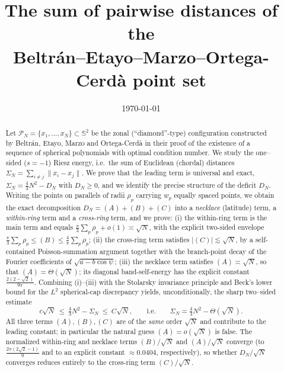 \documentclass[11pt,reqno]{amsart}
\theoremstyle{definition}
\newcommand{\Sph}{\mathbb{S}^2}
\newcommand{\PN}{\mathcal{P}_N}
\newcommand{\dist}[2]{\lVert #1-#2\rVert}
\newcommand{\abs}[1]{\lvert #1\rvert}
\newcommand{\Def}{D_N}
\newcommand{\Sig}{\Sigma_N}
\newcommand{\rp}{\rho}
\begin{document}
\title[Sum of distances for the BEMOC point set]
{The sum of pairwise distances of the\\ Beltr\'an--Etayo--Marzo--Ortega-Cerd\`a point set}

\author{}
\date{\today}

\begin{abstract}
Let $\PN=\{x_1,\dots,x_N\}\subset\Sph$ be the zonal (``diamond''-type) configuration constructed
by Beltr\'an, Etayo, Marzo and Ortega-Cerd\`a in their proof of the existence of a sequence of
spherical polynomials with optimal condition number. We study the one--sided ($s=-1$) Riesz energy,
i.e.\ the sum of Euclidean (chordal) distances
$\Sig=\sum_{i\ne j}\dist{x_i}{x_j}$.
We prove that the leading term is universal and exact,
$\Sig=\tfrac43N^2-\Def$ with $\Def\ge 0$, and we identify the precise structure of the deficit
$\Def$. Writing the points on parallels of radii $\rp_p$ carrying $w_p$ equally spaced points,
we obtain the exact decomposition $\Def=(A)+(B)+(C)$ into a \emph{necklace} (latitude) term,
a \emph{within-ring} term and a \emph{cross-ring} term, and we prove:
(i) the within-ring term is the main term and equals $\frac{\pi}{3}\sum_p\rp_p+o(1)\asymp\sqrt N$,
with the explicit two-sided envelope $\frac{\pi}{3}\sum_p\rp_p\le (B)\le\frac{4}{\pi}\sum_p\rp_p$;
(ii) the cross-ring term satisfies $\abs{(C)}\lesssim\sqrt N$, by a self-contained Poisson-summation
argument together with the branch-point decay of the Fourier coefficients of $\sqrt{a-b\cos\psi}$;
(iii) the necklace term satisfies $(A)\asymp\sqrt N$, so that $(A)=\Theta(\sqrt N)$; its diagonal
band-self-energy has the explicit constant $\frac{2(2-\sqrt2)}{9\pi}$.
Combining (i)--(iii) with the Stolarsky invariance principle and Beck's lower bound for the
$L^2$ spherical-cap discrepancy yields, unconditionally, the sharp two--sided estimate
\[
   c\sqrt N\ \le\ \tfrac43N^2-\Sig\ \le\ C\sqrt N ,
   \qquad\text{i.e.}\qquad \Sig=\tfrac43N^2-\Theta(\sqrt N).
\]
All three terms $(A),(B),(C)$ are of the \emph{same} order $\sqrt N$ and contribute to the leading
constant; in particular the natural guess $(A)=o(\sqrt N)$ is false. The normalized within-ring and
necklace terms $(B)/\sqrt N$ and $(A)/\sqrt N$ converge (to $\frac{2\pi(2\sqrt2-1)}{9}$ and to an
explicit constant $\approx0.0404$, respectively), so whether $\Def/\sqrt N$ converges reduces
entirely to the cross-ring term $(C)/\sqrt N$.
\end{abstract}

\maketitle
\end{document}
